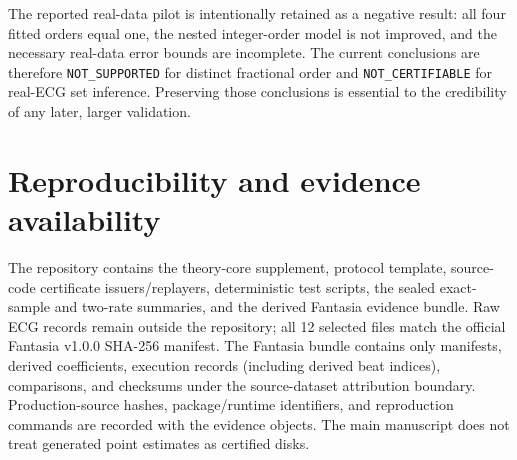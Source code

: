 \documentclass[11pt]{article}
\theoremstyle{definition}
\theoremstyle{remark}
\newcommand{\status}[1]{\texttt{#1}}
\begin{document}
The reported real-data pilot is intentionally retained as a negative result: all
four fitted orders equal one, the nested integer-order model is not improved,
and the necessary real-data error bounds are incomplete.  The current
conclusions are therefore \status{NOT\_SUPPORTED} for distinct fractional
order and \status{NOT\_CERTIFIABLE} for real-ECG set inference.  Preserving
those conclusions is essential to the credibility of any later, larger
validation.

\section*{Reproducibility and evidence availability}

The repository contains the theory-core supplement, protocol template,
source-code certificate issuers/replayers, deterministic test scripts, the
sealed exact-sample and two-rate summaries, and the derived Fantasia evidence
bundle.  Raw ECG records remain outside the repository; all 12 selected files
match the official Fantasia v1.0.0 SHA-256 manifest.  The Fantasia bundle
contains only manifests, derived coefficients, execution records (including
derived beat indices), comparisons, and checksums under the source-dataset
attribution boundary.  Production-source hashes, package/runtime identifiers,
and reproduction commands are recorded with the evidence objects.  The main
manuscript does not treat generated point estimates as certified disks.
\end{document}
